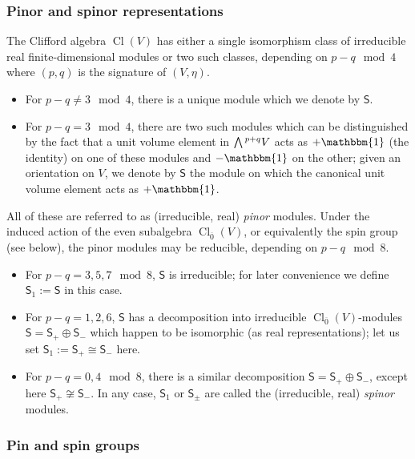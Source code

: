 \documentclass[10pt,a4paper]{amsart}
\numberwithin{equation}{section}
\newcommand{\ssS}{\mathsf{S}}
\newcommand{\Wedge}{\mathchoice{{\textstyle\bigwedge}}{\bigwedge}{\bigwedge}{\bigwedge}}	%
\newcommand{\1}{\mathbbm{1}}
\DeclareMathOperator{\Cl}{Cl}
\begin{document}
\subsubsection{Pinor and spinor representations}
\label{sec:pinor-spinor}

The Clifford algebra $\Cl(V)$ has either a single isomorphism class of irreducible real finite-dimensional modules or two such classes, depending on $p-q\mod 4$ where $(p,q)$ is the signature of $(V,\eta)$.
\begin{itemize}\itemsep=0pt
	\item For $p-q\neq 3\mod 4$, there is a unique module which we denote by $\ssS$.
	\item For $p-q = 3 \mod 4$, there are two such modules which can be distinguished by the fact that a unit volume element in $\Wedge^{p+q}V$ acts as $+\1$ (the identity) on one of these modules and $-\1$ on the other; given an orientation on $V$, we denote by $\ssS$ the module on which the canonical unit volume element acts as $+\1$.
\end{itemize}
All of these are referred to as (irreducible, real) \emph{pinor} modules. Under the induced action of the even subalgebra $\Cl_{\overline 0}(V)$, or equivalently the spin group (see below), the pinor modules may be reducible, depending on $p-q\mod 8$.
\begin{itemize}\itemsep=0pt
	\item For $p-q=3,5,7 \mod 8$, $\ssS$ is irreducible; for later convenience we define $\ssS_1:=\ssS$ in this case.
	\item For $p-q=1,2,6$, $\ssS$ has a decomposition into irreducible $\Cl_{\overline0}(V)$-modules $\ssS=\ssS_+\oplus\ssS_-$ which happen to be isomorphic (as real representations); let us set $\ssS_1:=\ssS_+\cong\ssS_-$ here.
	\item For $p-q=0,4\mod 8$, there is a similar decomposition $\ssS=\ssS_+\oplus\ssS_-$, except here $\ssS_+\not\cong\ssS_-$. In any case, $\ssS_1$ or $\ssS_\pm$ are called the (irreducible, real) \emph{spinor} modules.
\end{itemize}

\subsubsection{Pin and spin groups}
\label{sec:pin-spin-group}
\end{document}
